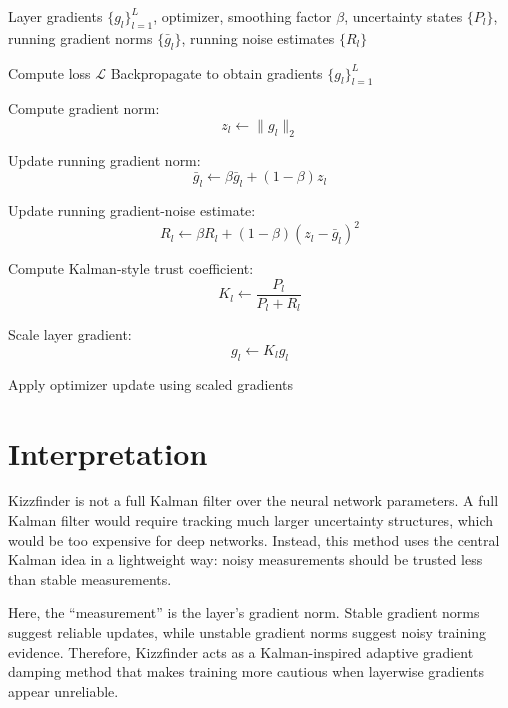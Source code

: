 \documentclass{article}
\begin{document}
\begin{algorithm}[H]
\caption{Kizzfinder: Layerwise Kalman-Style Gradient Trust Scaling}
\begin{algorithmic}[1]
\Require Layer gradients $\{g_l\}_{l=1}^{L}$, optimizer, smoothing factor $\beta$, uncertainty states $\{P_l\}$, running gradient norms $\{\bar{g}_l\}$, running noise estimates $\{R_l\}$

    \State Compute loss $\mathcal{L}$
    \State Backpropagate to obtain gradients $\{g_l\}_{l=1}^{L}$

        \State Compute gradient norm:
        \[
            z_l \gets \|g_l\|_2
        \]

        \State Update running gradient norm:
        \[
            \bar{g}_l \gets \beta \bar{g}_l + (1-\beta)z_l
        \]

        \State Update running gradient-noise estimate:
        \[
            R_l \gets \beta R_l + (1-\beta)(z_l-\bar{g}_l)^2
        \]

        \State Compute Kalman-style trust coefficient:
        \[
            K_l \gets \frac{P_l}{P_l + R_l}
        \]

        \State Scale layer gradient:
        \[
            g_l \gets K_l g_l
        \]
    \EndFor

    \State Apply optimizer update using scaled gradients
\EndFor

\end{algorithmic}
\end{algorithm}

\section{Interpretation}

Kizzfinder is not a full Kalman filter over the neural network parameters. A full Kalman filter would require tracking much larger uncertainty structures, which would be too expensive for deep networks. Instead, this method uses the central Kalman idea in a lightweight way: noisy measurements should be trusted less than stable measurements.

Here, the ``measurement'' is the layer's gradient norm. Stable gradient norms suggest reliable updates, while unstable gradient norms suggest noisy training evidence. Therefore, Kizzfinder acts as a Kalman-inspired adaptive gradient damping method that makes training more cautious when layerwise gradients appear unreliable.
\end{document}
